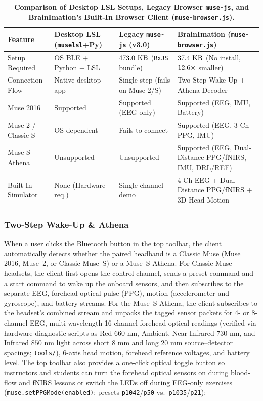 \documentclass[11pt]{article}
\begin{document}
\begin{table}[t!]
\centering
\caption{\textbf{Comparison of Desktop LSL Setups, Legacy Browser \texttt{muse-js}, and BrainImation's Built-In Browser Client (\texttt{muse-browser.js}).}}
\label{tab:gatt}
\footnotesize
\setlength{\tabcolsep}{5pt}
\begin{tabular}{p{}p{}p{}p{}}
\toprule
\textbf{Feature} & \textbf{Desktop LSL (\texttt{muselsl}+Py)} & \textbf{Legacy \texttt{muse-js} (v3.0)} & \textbf{BrainImation (\texttt{muse-browser.js})} \\
\midrule
Setup Required & OS BLE + Python + LSL & $473.0\text{ KB}$ (\texttt{RxJS} bundle) & $37.4\text{ KB}$ (No install, $12.6\times$ smaller) \\
Connection Flow & Native desktop app & Single-step (fails on Muse 2/S) & Two-Step Wake-Up + Athena Decoder \\
Muse 2016 & Supported & Supported (EEG only) & Supported (EEG, IMU, Battery) \\
Muse 2 / Classic S & OS-dependent & Fails to connect & Supported (EEG, 3-Ch PPG, IMU) \\
Muse S Athena & Unsupported & Unsupported & Supported (EEG, Dual-Distance PPG/fNIRS, IMU, DRL/REF) \\
Built-In Simulator & None (Hardware req.) & Single-channel demo & 4-Ch EEG + Dual-Distance PPG/fNIRS + 3D Head Motion \\
\bottomrule
\end{tabular}
\end{table}

\subsubsection{Two-Step Wake-Up \& Athena}
When a user clicks the Bluetooth button in the top toolbar, the client automatically detects whether the paired headband is a Classic Muse (Muse 2016, Muse~2, or Classic Muse~S) or a Muse~S Athena. For Classic Muse headsets, the client first opens the control channel, sends a preset command and a start command to wake up the onboard sensors, and then subscribes to the separate EEG, forehead optical pulse (PPG), motion (accelerometer and gyroscope), and battery streams. For the Muse~S Athena, the client subscribes to the headset's combined stream and unpacks the tagged sensor packets for 4- or 8-channel EEG, multi-wavelength 16-channel forehead optical readings (verified via hardware diagnostic scripts as Red $660\text{ nm}$, Ambient, Near-Infrared $730\text{ nm}$, and Infrared $850\text{ nm}$ light across short $8\text{ mm}$ and long $20\text{ mm}$ source--detector spacings; \texttt{tools/}), 6-axis head motion, forehead reference voltages, and battery level. The top toolbar also provides a one-click optical toggle button so instructors and students can turn the forehead optical sensors on during blood-flow and fNIRS lessons or switch the LEDs off during EEG-only exercises (\texttt{muse.setPPGMode(enabled)}; presets \texttt{p1042}/\texttt{p50} vs.\ \texttt{p1035}/\texttt{p21}):
\end{document}
